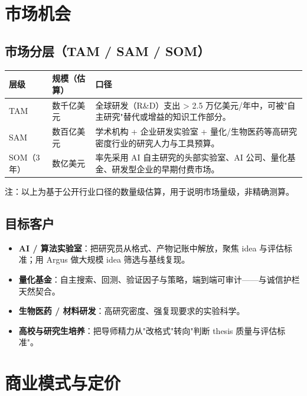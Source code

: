 \documentclass[UTF8,11pt,fontset=none]{ctexart}
\newcommand{\hl}[1]{\textbf{\color{argusnavy}#1}}
\newcommand{\thd}[1]{\textbf{\color{white}#1}}
\newcommand{\headrow}{\rowcolor{argusnavy}}
\newcommand{\altrow}{\rowcolor{arguslight}}
\begin{document}
\section{市场机会}

\subsection{市场分层（TAM / SAM / SOM）}

\begin{tabularx}{\textwidth}{@{}l >{\raggedright\arraybackslash}p{3.2cm} X@{}}
\toprule
\headrow \thd{层级} & \thd{规模（估算）} & \thd{口径} \\
\midrule
\altrow TAM & 数千亿美元 & 全球研发（R\&D）支出 > 2.5 万亿美元/年中，可被"自主研究"替代或增益的知识工作部分。 \\
SAM & 数百亿美元 & 学术机构 + 企业研发实验室 + 量化/生物医药等高研究密度行业的研究人力与工具预算。 \\
\altrow SOM（3年） & 数亿美元 & 率先采用 AI 自主研究的头部实验室、AI 公司、量化基金、研发型企业的早期付费市场。 \\
\bottomrule
\end{tabularx}

\footnotesize\color{argusgray}注：以上为基于公开行业口径的数量级估算，用于说明市场量级，非精确测算。\normalsize\color{black}

\subsection{目标客户}
\begin{itemize}
  \item \hl{AI / 算法实验室}：把研究员从格式、产物记账中解放，聚焦 idea 与评估标准；用 Argus 做大规模 idea 筛选与基线复现。
  \item \hl{量化基金}：自主搜索、回测、验证因子与策略，端到端可审计——与诚信护栏天然契合。
  \item \hl{生物医药 / 材料研发}：高研究密度、强复现要求的实验科学。
  \item \hl{高校与研究生培养}：把导师精力从"改格式"转向"判断 thesis 质量与评估标准"。
\end{itemize}

\section{商业模式与定价}
\end{document}
